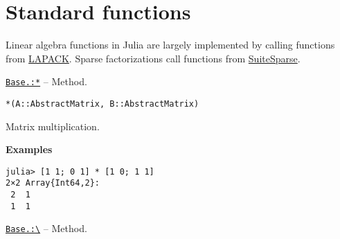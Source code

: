 \hypertarget{10454442684761744234}{}


\section{Standard functions}



Linear algebra functions in Julia are largely implemented by calling functions from \href{http://www.netlib.org/lapack/}{LAPACK}.  Sparse factorizations call functions from \href{http://faculty.cse.tamu.edu/davis/suitesparse.html}{SuiteSparse}.


\hypertarget{9051502204834048921}{} 
\hyperlink{9051502204834048921}{\texttt{Base.:*}}  -- {Method.}

\begin{adjustwidth}{2em}{0pt}


\begin{verbatim}
*(A::AbstractMatrix, B::AbstractMatrix)
\end{verbatim}

Matrix multiplication.

\textbf{Examples}


\begin{verbatim}
julia> [1 1; 0 1] * [1 0; 1 1]
2×2 Array{Int64,2}:
 2  1
 1  1
\end{verbatim}



\end{adjustwidth}
\hypertarget{9779560736429840808}{} 
\hyperlink{9779560736429840808}{\texttt{Base.:{\textbackslash}}}  -- {Method.}


